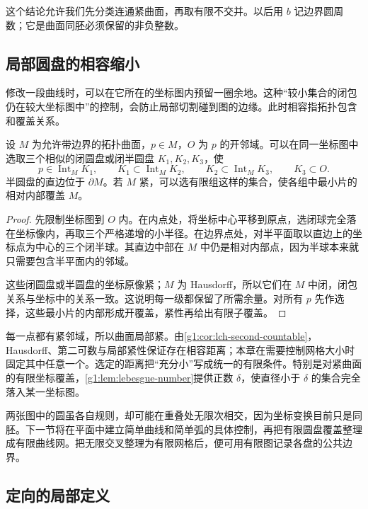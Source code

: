 这个结论允许我们先分类连通紧曲面，再取有限不交并。以后用 \(b\) 记边界圆周数；它是曲面同胚必须保留的非负整数。

\subsection{局部圆盘的相容缩小}
\label{g1:subsec:0601:02}

修改一段曲线时，可以在它所在的坐标图内预留一圈余地。这种“较小集合的闭包仍在较大坐标图中”的控制，会防止局部切割碰到图的边缘。此时相容指拓扑包含和覆盖关系。

\begin{lemma}\label{g1:lem:nested-surface-charts}
	设 \(M\) 为允许带边界的拓扑曲面，\(p\in M\)，\(O\) 为 \(p\) 的开邻域。可以在同一坐标图中选取三个相似的闭圆盘或闭半圆盘 \(K_1,K_2,K_3\)，使
	\[
		p\in\operatorname{Int}_M K_1,\qquad
		K_1\subset\operatorname{Int}_M K_2,\qquad
		K_2\subset\operatorname{Int}_M K_3,\qquad K_3\subset O.
	\]
	半圆盘的直边位于 \(\partial M\)。若 \(M\) 紧，可以选有限组这样的集合，使各组中最小片的相对内部覆盖 \(M\)。
\end{lemma}
\begin{proof}
	先限制坐标图到 \(O\) 内。在内点处，将坐标中心平移到原点，选闭球完全落在坐标像内，再取三个严格递增的小半径。在边界点处，对半平面取以直边上的坐标点为中心的三个闭半球。其直边中部在 \(M\) 中仍是相对内部点，因为半球本来就只需要包含半平面内的邻域。

	这些闭圆盘或半圆盘的坐标原像紧；\(M\) 为 Hausdorff，所以它们在 \(M\) 中闭，闭包关系与坐标中的关系一致。这说明每一级都保留了所需余量。对所有 \(p\) 先作选择，这些最小片的内部形成开覆盖，紧性再给出有限子覆盖。
\end{proof}

每一点都有紧邻域，所以曲面局部紧。由\cref{g1:cor:lch-second-countable}，Hausdorff、第二可数与局部紧性保证存在相容距离；本章在需要控制网格大小时固定其中任意一个。选定的距离把“充分小”写成统一的有限条件。特别是对紧曲面的有限坐标覆盖，\cref{g1:lem:lebesgue-number}提供正数 \(\delta\)，使直径小于 \(\delta\) 的集合完全落入某一坐标图。

\ProseParagraphBreak

两张图中的圆虽各自规则，却可能在重叠处无限次相交，因为坐标变换目前只是同胚。下一节将在平面中建立简单曲线和简单弧的具体控制，再把有限圆盘覆盖整理成有限曲线网。把无限交叉整理为有限网格后，便可用有限图记录各盘的公共边界。

\subsection{定向的局部定义}
\label{g1:subsec:0601:03}

